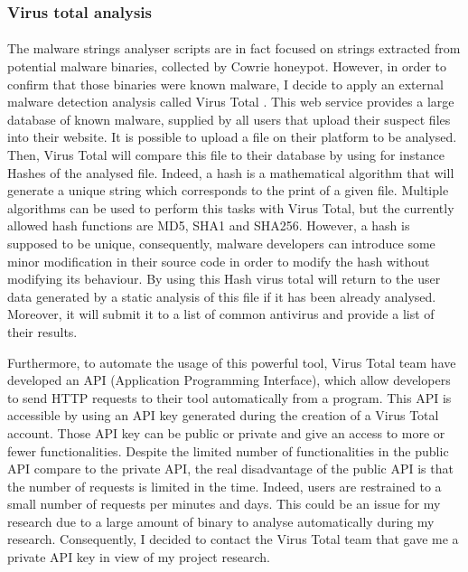 \subsubsection{Virus total analysis} %

\paragraph{}

The malware strings analyser scripts are in fact focused on strings extracted from potential
malware binaries, collected by Cowrie honeypot. However, in order to confirm that those
binaries were known malware, I decide to apply an external malware detection analysis
called Virus Total \cite{vt}. This web service provides a large database of known malware, supplied by 
all users that upload their suspect files into their website.
It is possible to upload a file on their platform to be analysed. Then, Virus Total
will compare this file to their database by using for instance Hashes of the analysed file.
Indeed, a hash is a mathematical algorithm that will generate a unique string which corresponds
to the print of a given file. Multiple algorithms can be used to perform this tasks with Virus
Total, but the currently allowed hash functions are MD5, SHA1 and SHA256. However, a hash is 
supposed to be unique, consequently, malware developers can introduce some minor modification
in their source code in order to modify the hash without modifying its behaviour.
By using this Hash virus total will return to the user data generated by a static analysis 
of this file if it has been already analysed. Moreover, it will submit it to a list of common
antivirus and provide a list of their results.

Furthermore, to automate the usage of this powerful tool, Virus Total team have developed
an API (Application Programming Interface), which allow developers to send HTTP requests to
their tool automatically from a program. This API is accessible by using an API key generated
during the creation of a Virus Total account. Those API key can be public or private and 
give an access to more or fewer functionalities. Despite the limited number of functionalities
in the public API compare to the private API, the real disadvantage of the public API is that
the number of requests is limited in the time. Indeed, users are restrained to a small
number of requests per minutes and days. This could be an issue for my research due to a large amount of binary to analyse automatically during my research. Consequently, I decided
to contact the Virus Total team that gave me a private API key in view of my project
research.

